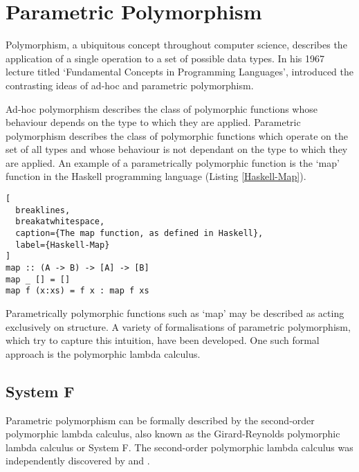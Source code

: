 \documentclass[11pt,openright,hidelinks,a4paper]{article}
\begin{document}
\section{Parametric Polymorphism}
Polymorphism, a ubiquitous concept throughout computer science, describes the application of a single operation to a set of possible data types. In his 1967 lecture titled `Fundamental Concepts in Programming Languages',  introduced the contrasting ideas of ad-hoc and parametric polymorphism.
\par
Ad-hoc polymorphism describes the class of polymorphic functions whose behaviour depends on the type to which they are applied. Parametric polymorphism describes the class of polymorphic functions which operate on the set of all types and whose behaviour is not dependant on the type to which they are applied. An example of a parametrically polymorphic function is the `map' function in the Haskell programming language (Listing \ref{Haskell-Map}).
\begin{lstlisting}[
  breaklines,
  breakatwhitespace,
  caption={The map function, as defined in Haskell},
  label={Haskell-Map}
]
map :: (A -> B) -> [A] -> [B]
map _ [] = []
map f (x:xs) = f x : map f xs
\end{lstlisting}
Parametrically polymorphic functions such as `map' may be described as acting exclusively on structure. A variety of formalisations of parametric polymorphism, which try to capture this intuition, have been developed. One such formal approach is the polymorphic lambda calculus.

\subsection{System F}
Parametric polymorphism can be formally described by the second-order polymorphic lambda calculus, also known as the Girard-Reynolds polymorphic lambda calculus or System F. The second-order polymorphic lambda calculus was independently discovered by  and .
\end{document}
